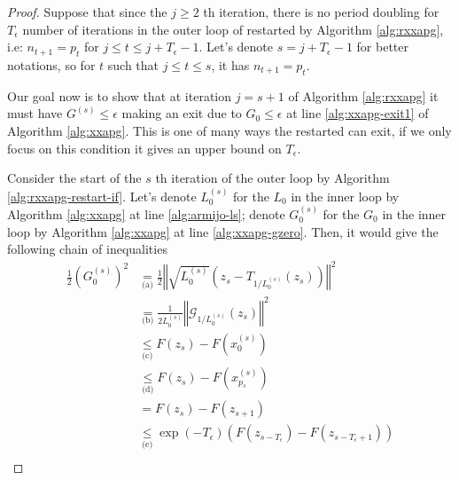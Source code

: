 \documentclass[12pt]{report}
\begin{document}
        \begin{proof}
            Suppose that since the $j\ge 2$ th iteration, there is no period doubling for $T_\epsilon$ number of iterations in the outer loop of restarted \XXAPG{} by Algorithm \ref{alg:rxxapg}, i.e: $n_{t + 1} = p_t$ for $j \le t \le j + T_\epsilon - 1$. 
            Let's denote $s = j + T_\epsilon -1$ for better notations, so for $t$ such that $j \le t \le s$, it has $n_{t + 1} = p_t$. 
            \par
            Our goal now is to show that at iteration $j = s + 1$ of Algorithm \ref{alg:rxxapg} it must have $G^{(s)} \le \epsilon$ making an exit due to $G_0 \le \epsilon$ at line \ref{alg:xxapg-exit1} of Algorithm \ref{alg:xxapg}. 
            This is one of many ways the restarted \XXAPG{} can exit, if we only focus on this condition it gives an upper bound on $T_\epsilon$. 
            \par
            Consider the start of the $s$ th iteration of the outer loop by Algorithm \ref{alg:rxxapg-restart-if}.
            Let's denote $L_0^{(s)}$ for the $L_0$ in the inner loop by Algorithm \ref{alg:xxapg} at line \ref{alg:armijo-ls}; denote $G_0^{(s)}$ for the $G_0$ in the inner loop by Algorithm \ref{alg:xxapg} at line \ref{alg:xxapg-gzero}. 
            Then, it would give the following chain of inequalities
            {\allowdisplaybreaks
            \begin{align*}
                \frac{1}{2}\left(
                    G_0^{(s)}
                \right)^2
                &\underset{\text{(a)}}{=} 
                \frac{1}{2}\left\Vert
                    \sqrt{L_0^{(s)}}\left(z_s - T_{1/L_0^{(s)}}(z_s)\right)
                \right\Vert^2
                \\
                &\underset{\text{(b)}}{=} \frac{1}{2L_0^{(s)}}\left\Vert
                        \mathcal G_{1/L_0^{(s)}}(z_s)
                \right\Vert^2
                \\
                &\underset{\text{(c)}}{\le} F(z_s) - F\left(x_0^{(s)}\right) 
                \\
                &\underset{\text{(d)}}{\le} 
                F(z_s) - F\left(x_{p_s}^{(s)}\right)
                \\
                &= F(z_s) - F(z_{s + 1})
                \\
                &\underset{\text{(e)}}{\le} \exp(-T_\epsilon)\left(F(z_{s - T_\epsilon}) - F(z_{s - T_\epsilon + 1})\right)
                \\

\end{align*}}
\end{proof}
\end{document}
